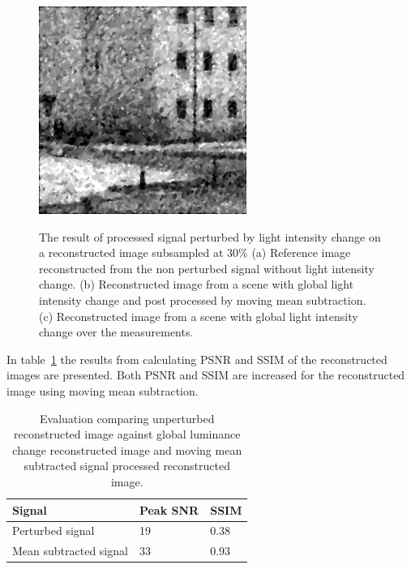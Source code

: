\begin{figure}[H]
\begin{minipage}[t]{0.32\textwidth}
    \subcaption{}
    \label{fig:lum_4}
\end{minipage}
\begin{minipage}[t]{0.32\textwidth}
    \includegraphics[width = \textwidth]{result/dynamic/lum/intense_change_psnr_19_snr_14_sssim_38.png}
    \subcaption{}
    \label{fig:lum_32}
\end{minipage}
    \caption{The result of processed signal perturbed by light intensity change on a reconstructed image subsampled at 30\% (a) Reference image reconstructed from the non perturbed signal without light intensity change. (b) Reconstructed image from a scene with global light intensity change and post processed by moving mean subtraction. (c) Reconstructed image from a scene with global light intensity change over the measurements.}
    \label{fig:lum_rec}
\end{figure}

In table~\ref{tab:lum_dyn} the results from calculating PSNR and SSIM of the reconstructed images are presented. Both PSNR and SSIM are increased for the reconstructed image using moving mean subtraction.


\begin{table}[H]
    \centering
  \begin{tabular}{ | l | l | l |}
    \hline
    Signal & Peak SNR  & SSIM \\ \hline
    Perturbed signal & 19  & 0.38 \\ \hline
    Mean subtracted signal & 33  & 0.93 \\
    \hline
  \end{tabular}
      \caption{Evaluation comparing unperturbed reconstructed image against global luminance change reconstructed image and moving mean subtracted signal processed reconstructed image.}
    \label{tab:lum_dyn}
\end{table}




